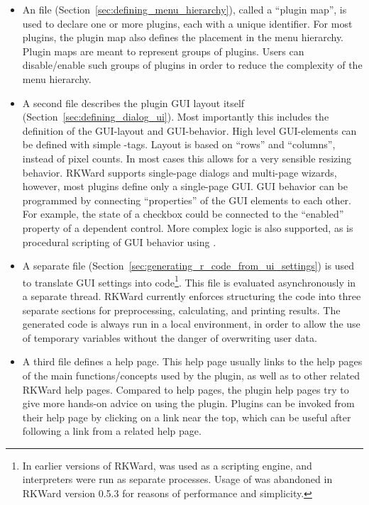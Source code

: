 \begin{itemize}
    \item
    An  file (Section~\ref{sec:defining_menu_hierarchy}), 
    called a ``plugin map'', is used to declare one or more plugins, each
    with a unique identifier. For most plugins, the plugin map also defines the
    placement in the menu hierarchy. Plugin maps are meant to represent groups of
    plugins. Users can disable/enable such groups of plugins in order to reduce the
    complexity of the menu hierarchy.

    \item
    A second  file describes the plugin GUI layout itself (Section~\ref{sec:defining_dialog_ui}). 
    Most importantly this includes
    the definition of the GUI-layout and GUI-behavior. High level GUI-elements can
    be defined with simple -tags. Layout is based on ``rows'' and ``columns'',
    instead of pixel counts. In most cases this allows for a very sensible resizing
    behavior. RKWard supports single-page dialogs and multi-page wizards, however,
    most plugins define only a single-page GUI. GUI behavior can be programmed by
    connecting ``properties'' of the GUI elements to each other. For example, the state
    of a checkbox could be connected to the ``enabled'' property of a dependent
    control. More complex logic is also supported, as is procedural scripting of GUI
    behavior using .

    \item
    A separate  file (Section~\ref{sec:generating_r_code_from_ui_settings}) 
    is used to translate GUI settings into 
    code\footnote{
        In earlier versions of RKWard,  was used
        as a scripting engine, and  interpreters were run as separate processes.
        Usage of  was abandoned in RKWard version 0.5.3 for reasons of performance and simplicity.
    }. This  file is evaluated asynchronously in a separate thread. RKWard
    currently enforces structuring the code into three separate sections for
    preprocessing, calculating, and printing results. The generated code is always
    run in a local environment, in order to allow the use of temporary variables
    without the danger of overwriting user data.

    \item
    A third  file defines a help page. This help page usually links to the  help
    pages of the main functions/concepts used by the plugin, as well as to other 
    related RKWard help pages. Compared to  help
    pages, the plugin help pages try to give more hands-on advice on using the
    plugin. Plugins can be invoked from their help page by clicking on a link near
    the top, which can be useful after following a link from a related help page.
\end{itemize}

